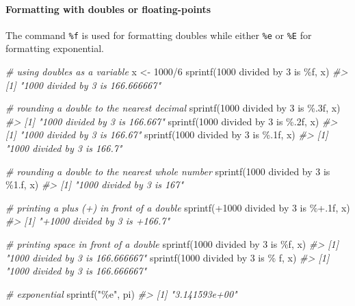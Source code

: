 \documentclass[
]{book}
\newenvironment{Shaded}{\begin{snugshade}}{\end{snugshade}}
\newcommand{\CommentTok}[1]{\textcolor[rgb]{0.56,0.35,0.01}{\textit{#1}}}
\newcommand{\DecValTok}[1]{\textcolor[rgb]{0.00,0.00,0.81}{#1}}
\newcommand{\FunctionTok}[1]{\textcolor[rgb]{0.00,0.00,0.00}{#1}}
\newcommand{\NormalTok}[1]{#1}
\newcommand{\OtherTok}[1]{\textcolor[rgb]{0.56,0.35,0.01}{#1}}
\newcommand{\SpecialCharTok}[1]{\textcolor[rgb]{0.00,0.00,0.00}{#1}}
\newcommand{\StringTok}[1]{\textcolor[rgb]{0.31,0.60,0.02}{#1}}
\begin{document}
\hypertarget{formatting-with-doubles-or-floating-points}{%
\paragraph{Formatting with doubles or floating-points}\label{formatting-with-doubles-or-floating-points}}

The command \texttt{\%f} is used for formatting doubles while either \texttt{\%e} or \texttt{\%E} for formatting exponential.

\begin{Shaded}
\begin{Highlighting}[]
\CommentTok{\# using doubles as a variable}
\NormalTok{x }\OtherTok{\textless{}{-}} \DecValTok{1000}\SpecialCharTok{/}\DecValTok{6}
\FunctionTok{sprintf}\NormalTok{(}\StringTok{\textquotesingle{}1000 divided by 3 is \%f\textquotesingle{}}\NormalTok{, x)}
\CommentTok{\#\textgreater{} [1] "1000 divided by 3 is 166.666667"}

\CommentTok{\# rounding a double to the nearest decimal}
\FunctionTok{sprintf}\NormalTok{(}\StringTok{\textquotesingle{}1000 divided by 3 is \%.3f\textquotesingle{}}\NormalTok{, x)}
\CommentTok{\#\textgreater{} [1] "1000 divided by 3 is 166.667"}
\FunctionTok{sprintf}\NormalTok{(}\StringTok{\textquotesingle{}1000 divided by 3 is \%.2f\textquotesingle{}}\NormalTok{, x)}
\CommentTok{\#\textgreater{} [1] "1000 divided by 3 is 166.67"}
\FunctionTok{sprintf}\NormalTok{(}\StringTok{\textquotesingle{}1000 divided by 3 is \%.1f\textquotesingle{}}\NormalTok{, x)}
\CommentTok{\#\textgreater{} [1] "1000 divided by 3 is 166.7"}

\CommentTok{\# rounding a double to the nearest whole number}
\FunctionTok{sprintf}\NormalTok{(}\StringTok{\textquotesingle{}1000 divided by 3 is \%1.f\textquotesingle{}}\NormalTok{, x)}
\CommentTok{\#\textgreater{} [1] "1000 divided by 3 is 167"}

\CommentTok{\# printing a plus (+) in front of a double}
\FunctionTok{sprintf}\NormalTok{(}\StringTok{\textquotesingle{}+1000 divided by 3 is \%+.1f\textquotesingle{}}\NormalTok{, x)}
\CommentTok{\#\textgreater{} [1] "+1000 divided by 3 is +166.7"}

\CommentTok{\# printing space in front of a double}
\FunctionTok{sprintf}\NormalTok{(}\StringTok{\textquotesingle{}1000 divided by 3 is \%f\textquotesingle{}}\NormalTok{, x)}
\CommentTok{\#\textgreater{} [1] "1000 divided by 3 is 166.666667"}
\FunctionTok{sprintf}\NormalTok{(}\StringTok{\textquotesingle{}1000 divided by 3 is \% f\textquotesingle{}}\NormalTok{, x)}
\CommentTok{\#\textgreater{} [1] "1000 divided by 3 is  166.666667"}

\CommentTok{\# exponential}
\FunctionTok{sprintf}\NormalTok{(}\StringTok{"\%e"}\NormalTok{, pi)}
\CommentTok{\#\textgreater{} [1] "3.141593e+00"}
\end{Highlighting}
\end{Shaded}
\end{document}
